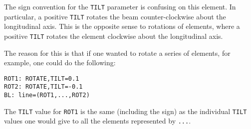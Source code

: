 The sign convention for the {\tt TILT}  parameter is confusing on this element.
In particular, a positive {\tt TILT} rotates the beam counter-clockwise about the
longitudinal axis.  This is the opposite sense to rotations of elements, where a 
positive {\tt TILT} rotates the element clockwise about the longitudinal axis.

The reason for this is that if one wanted to rotate a series of elements, for example,
one could do the following:
\begin{verbatim}
ROT1: ROTATE,TILT=0.1
ROT2: ROTATE,TILT=-0.1
BL: line=(ROT1,...,ROT2)
\end{verbatim}
The {\tt TILT} value for {\tt ROT1} is the same (including the sign) as the individual
{\tt TILT} values one would give to all the elements represented by \verb|...|.

